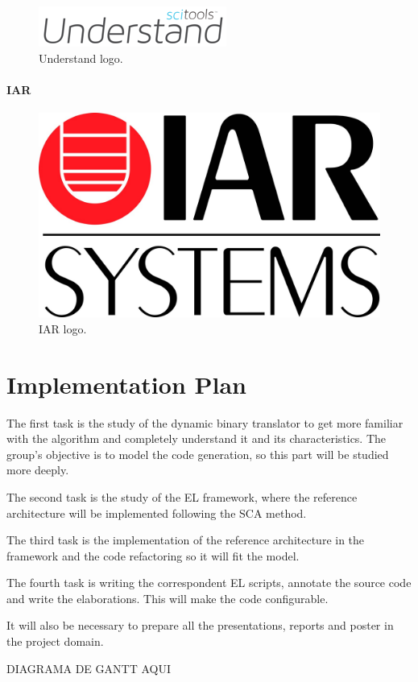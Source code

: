 \documentclass{report}
\begin{document}
			\begin{figure} [!h]
				\centering
				\includegraphics[width=0.3\linewidth]{Images/understand}
				\caption{Understand logo.}
				\label{fig:understand}
			\end{figure}

			\paragraph{IAR}
			
			\begin{figure} [!h]
				\centering
				\includegraphics[width=0.2\linewidth]{Images/iar.jpg}
				\caption{IAR logo.}
				\label{fig:iar}
			\end{figure}

	\section{Implementation Plan}
	
	\par The first task is the study of the dynamic binary translator to get more familiar with the algorithm and completely understand it and its characteristics. The group's objective is to model the code generation, so this part will be studied more deeply.
	\par The second task is the study of the EL framework, where the reference architecture will be implemented following the SCA method.
	\par The third task is the implementation of the reference architecture in the framework and the code refactoring so it will fit the model. 
	\par The fourth task is writing the correspondent EL scripts, annotate the source code and write the elaborations. This will make the code configurable.
	\par It will also be necessary to prepare all the presentations, reports and poster in the project domain.

	\par DIAGRAMA DE GANTT AQUI

\end{document}
